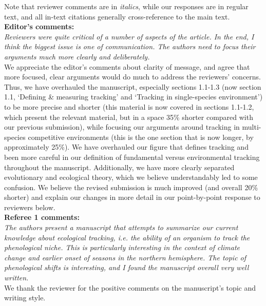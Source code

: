 \documentclass[11pt]{article}
\begin{document}
Note that reviewer comments are in \emph{italics}, while our responses are in regular text, and all in-text citations generally cross-reference to the main text.\\

{\bf Editor's comments:} \\

\emph{Reviewers were quite critical of a number of aspects of the article.  In the end, I think the
biggest issue is one of communication. The authors need to focus their arguments much more
clearly and deliberately.}\\

We appreciate the editor's comments about clarity of message, and agree that more focused, clear arguments would do much to address the reviewers' concerns. Thus, we have overhauled the manuscript, especially sections 1.1-1.3 (now section 1.1, `Defining \& measuring tracking' and `Tracking in single-species environment') to be more precise and shorter (this material is now covered in sections 1.1-1.2, which present the relevant material, but in a space 35\% shorter compared with our previous submission), while focusing our arguments around tracking in multi-species competitive environments (this is the one section that is now longer, by approximately 25\%). We have overhauled our figure that defines tracking and been more careful in our definition of fundamental versus environmental tracking throughout the manuscript. Additionally, we have more clearly separated evolutionary and ecological theory, which we believe understandably led to some confusion. We believe the revised submission is much improved (and overall 20\% shorter) and explain our changes in more detail in our point-by-point response to reviewers below.\\

{\bf Referee 1 comments:} \\

\emph{The authors present a manuscript that attempts to summarize our current knowledge about
ecological tracking, i.e. the ability of an organism to track the phenological niche. This is
particularly interesting in the context of climate change and earlier onset of seasons in the
northern hemisphere. The topic of phenological shifts is interesting, and I found the
manuscript overall very well written.}\\

We thank the reviewer for the positive comments on the manuscript's topic and writing style. \\
\end{document}
